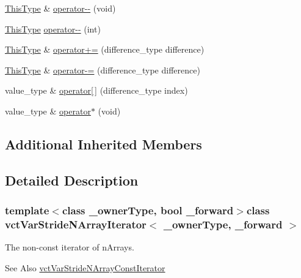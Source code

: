 \begin{DoxyCompactItemize}
\item 
\hyperlink{classvct_var_stride_n_array_const_iterator_ac729d2af265785aad6fdd43a70fbffdb}{This\-Type} \& \hyperlink{classvct_var_stride_n_array_iterator_a6dd95ef8683bfe4f0390b1d8596a858a}{operator-\/-\/} (void)
\item 
\hyperlink{classvct_var_stride_n_array_const_iterator_ac729d2af265785aad6fdd43a70fbffdb}{This\-Type} \hyperlink{classvct_var_stride_n_array_iterator_ad55f18e0117861f59d296f1b5a452164}{operator-\/-\/} (int)
\item 
\hyperlink{classvct_var_stride_n_array_const_iterator_ac729d2af265785aad6fdd43a70fbffdb}{This\-Type} \& \hyperlink{classvct_var_stride_n_array_iterator_a0351a9f203055ba0a2c4864670b96991}{operator+=} (difference\-\_\-type difference)
\item 
\hyperlink{classvct_var_stride_n_array_const_iterator_ac729d2af265785aad6fdd43a70fbffdb}{This\-Type} \& \hyperlink{classvct_var_stride_n_array_iterator_a425ef431bc52fd0bf8bacb3aaba76188}{operator-\/=} (difference\-\_\-type difference)
\item 
value\-\_\-type \& \hyperlink{classvct_var_stride_n_array_iterator_a6a32f0ed39083e58f7fd730626238d4a}{operator\mbox{[}$\,$\mbox{]}} (difference\-\_\-type index)
\item 
value\-\_\-type \& \hyperlink{classvct_var_stride_n_array_iterator_a10729a69529ebd104330f879bd8be454}{operator$\ast$} (void)
\end{DoxyCompactItemize}
\subsection*{Additional Inherited Members}


\subsection{Detailed Description}
\subsubsection*{template$<$class \-\_\-owner\-Type, bool \-\_\-forward$>$class vct\-Var\-Stride\-N\-Array\-Iterator$<$ \-\_\-owner\-Type, \-\_\-forward $>$}

The non-\/const iterator of n\-Arrays. \begin{DoxySeeAlso}{See Also}
\hyperlink{classvct_var_stride_n_array_const_iterator}{vct\-Var\-Stride\-N\-Array\-Const\-Iterator} 
\end{DoxySeeAlso}


